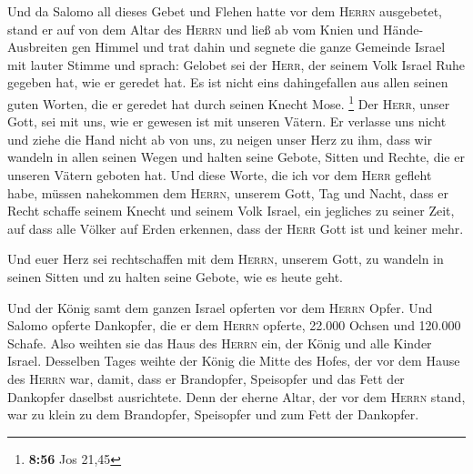  Und da Salomo all dieses Gebet und Flehen hatte vor dem
\textsc{Herrn} ausgebetet, stand er auf von dem Altar des \textsc{Herrn}
und ließ ab vom Knien und Hände-Ausbreiten gen Himmel 
und trat dahin und segnete die ganze Gemeinde Israel mit lauter Stimme
und sprach:  Gelobet sei der \textsc{Herr}, der seinem
Volk Israel Ruhe gegeben hat, wie er geredet hat. Es ist nicht eins
dahingefallen aus allen seinen guten Worten, die er geredet hat durch
seinen Knecht Mose. \footnote{\textbf{8:56} Jos 21,45} 
Der \textsc{Herr}, unser Gott, sei mit uns, wie er gewesen ist mit
unseren Vätern. Er verlasse uns nicht und ziehe die Hand nicht ab von
uns,  zu neigen unser Herz zu ihm, dass wir wandeln in
allen seinen Wegen und halten seine Gebote, Sitten und Rechte, die er
unseren Vätern geboten hat.  Und diese Worte, die ich vor
dem \textsc{Herr} gefleht habe, müssen nahekommen dem \textsc{Herrn},
unserem Gott, Tag und Nacht, dass er Recht schaffe seinem Knecht und
seinem Volk Israel, ein jegliches zu seiner Zeit,  auf
dass alle Völker auf Erden erkennen, dass der \textsc{Herr} Gott ist und
keiner mehr.

 Und euer Herz sei rechtschaffen mit dem \textsc{Herrn},
unserem Gott, zu wandeln in seinen Sitten und zu halten seine Gebote,
wie es heute geht.

 Und der König samt dem ganzen Israel opferten vor dem
\textsc{Herrn} Opfer.  Und Salomo opferte Dankopfer, die
er dem \textsc{Herrn} opferte, 22.000 Ochsen und 120.000 Schafe. Also
weihten sie das Haus des \textsc{Herrn} ein, der König und alle Kinder
Israel.  Desselben Tages weihte der König die Mitte des
Hofes, der vor dem Hause des \textsc{Herrn} war, damit, dass er
Brandopfer, Speisopfer und das Fett der Dankopfer daselbst ausrichtete.
Denn der eherne Altar, der vor dem \textsc{Herrn} stand, war zu klein zu
dem Brandopfer, Speisopfer und zum Fett der Dankopfer.

